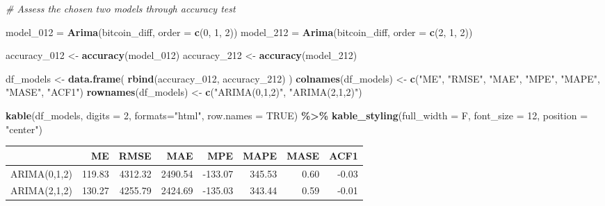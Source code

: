 \documentclass[
]{book}
\newenvironment{Shaded}{\begin{snugshade}}{\end{snugshade}}
\newcommand{\AttributeTok}[1]{\textcolor[rgb]{0.13,0.29,0.53}{#1}}
\newcommand{\CommentTok}[1]{\textcolor[rgb]{0.56,0.35,0.01}{\textit{#1}}}
\newcommand{\ConstantTok}[1]{\textcolor[rgb]{0.56,0.35,0.01}{#1}}
\newcommand{\DecValTok}[1]{\textcolor[rgb]{0.00,0.00,0.81}{#1}}
\newcommand{\FunctionTok}[1]{\textcolor[rgb]{0.13,0.29,0.53}{\textbf{#1}}}
\newcommand{\NormalTok}[1]{#1}
\newcommand{\OtherTok}[1]{\textcolor[rgb]{0.56,0.35,0.01}{#1}}
\newcommand{\SpecialCharTok}[1]{\textcolor[rgb]{0.81,0.36,0.00}{\textbf{#1}}}
\newcommand{\StringTok}[1]{\textcolor[rgb]{0.31,0.60,0.02}{#1}}
\begin{document}
\begin{Shaded}
\begin{Highlighting}[]
\CommentTok{\# Assess the chosen two models through accuracy test}

\NormalTok{model\_012 }\OtherTok{=} \FunctionTok{Arima}\NormalTok{(bitcoin\_diff, }\AttributeTok{order =} \FunctionTok{c}\NormalTok{(}\DecValTok{0}\NormalTok{, }\DecValTok{1}\NormalTok{, }\DecValTok{2}\NormalTok{))}
\NormalTok{model\_212 }\OtherTok{=} \FunctionTok{Arima}\NormalTok{(bitcoin\_diff, }\AttributeTok{order =} \FunctionTok{c}\NormalTok{(}\DecValTok{2}\NormalTok{, }\DecValTok{1}\NormalTok{, }\DecValTok{2}\NormalTok{))}

\NormalTok{accuracy\_012 }\OtherTok{\textless{}{-}} \FunctionTok{accuracy}\NormalTok{(model\_012)}
\NormalTok{accuracy\_212 }\OtherTok{\textless{}{-}} \FunctionTok{accuracy}\NormalTok{(model\_212)}



\NormalTok{df\_models }\OtherTok{\textless{}{-}} \FunctionTok{data.frame}\NormalTok{(}
\FunctionTok{rbind}\NormalTok{(accuracy\_012, accuracy\_212)}
\NormalTok{)}
\FunctionTok{colnames}\NormalTok{(df\_models) }\OtherTok{\textless{}{-}} \FunctionTok{c}\NormalTok{(}\StringTok{"ME"}\NormalTok{, }\StringTok{"RMSE"}\NormalTok{, }\StringTok{"MAE"}\NormalTok{, }\StringTok{"MPE"}\NormalTok{, }\StringTok{"MAPE"}\NormalTok{, }\StringTok{"MASE"}\NormalTok{, }\StringTok{"ACF1"}\NormalTok{)}
\FunctionTok{rownames}\NormalTok{(df\_models) }\OtherTok{\textless{}{-}} \FunctionTok{c}\NormalTok{(}\StringTok{"ARIMA(0,1,2)"}\NormalTok{,  }\StringTok{"ARIMA(2,1,2)"}\NormalTok{)}

\FunctionTok{kable}\NormalTok{(df\_models, }\AttributeTok{digits =} \DecValTok{2}\NormalTok{, }\AttributeTok{formats=}\StringTok{"html"}\NormalTok{, }\AttributeTok{row.names =} \ConstantTok{TRUE}\NormalTok{) }\SpecialCharTok{\%\textgreater{}\%}
  \FunctionTok{kable\_styling}\NormalTok{(}\AttributeTok{full\_width =}\NormalTok{ F, }\AttributeTok{font\_size =} \DecValTok{12}\NormalTok{, }\AttributeTok{position =} \StringTok{"center"}\NormalTok{)}
\end{Highlighting}
\end{Shaded}

\begin{table}
\centering\begingroup\fontsize{12}{14}\selectfont

\begin{tabular}{l|r|r|r|r|r|r|r}
\hline
  & ME & RMSE & MAE & MPE & MAPE & MASE & ACF1\\
\hline
ARIMA(0,1,2) & 119.83 & 4312.32 & 2490.54 & -133.07 & 345.53 & 0.60 & -0.03\\
\hline
ARIMA(2,1,2) & 130.27 & 4255.79 & 2424.69 & -135.03 & 343.44 & 0.59 & -0.01\\
\hline
\end{tabular}
\endgroup{}
\end{table}
\end{document}
